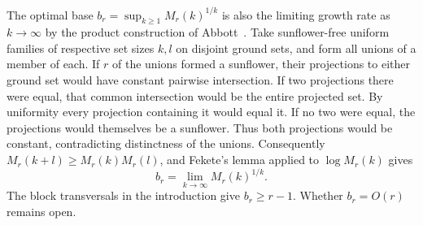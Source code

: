 The optimal base \(b_r=\sup_{k\ge1}M_r(k)^{1/k}\) is also the limiting
growth rate as \(k\to\infty\) by the product construction of
Abbott~\cite[Theorem~1]{Abbott66}. Take sunflower-free uniform
families of respective set sizes \(k,l\) on disjoint ground sets, and
form all unions of a member of each. If \(r\) of the unions formed a
sunflower, their projections to either ground set would have constant
pairwise intersection. If two projections there were equal, that
common intersection would be the entire projected set. By uniformity
every projection containing it would equal it. If no two were equal,
the projections would themselves be a sunflower. Thus both projections
would be constant, contradicting distinctness of the unions.
Consequently \(M_r(k+l)\ge M_r(k)M_r(l)\), and Fekete's
lemma applied to \(\log M_r(k)\) gives
\[
                         b_r=\lim_{k\to\infty}M_r(k)^{1/k}.
\]
The block transversals in the introduction give \(b_r\ge r-1\).
Whether \(b_r=O(r)\) remains open.
